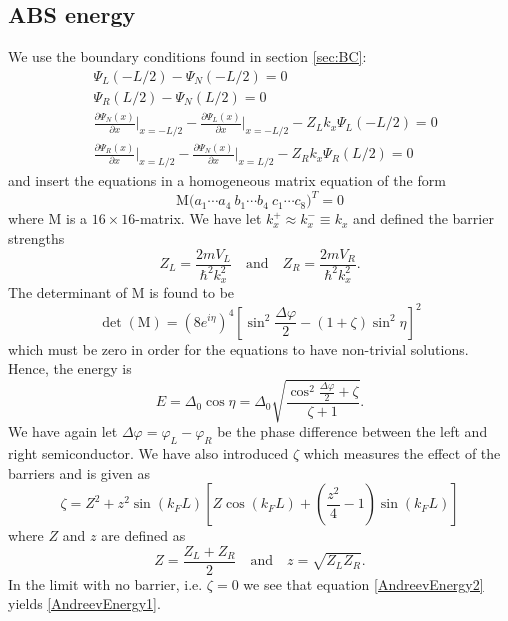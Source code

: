 \subsection{ABS energy}
We use the boundary conditions found in section \ref{sec:BC}:
\begin{equation}
\begin{split}
    &\Psi_L(-L/2) - \Psi_N(-L/2) = 0\\
    &\Psi_R(L/2) - \Psi_N(L/2) = 0\\
    &\frac{\partial \Psi_N(x)}{\partial x}\bigg|_{x = -L/2} - \frac{\partial \Psi_L(x)}{\partial x}\bigg|_{x = -L/2} - Z_L k_x\Psi_L(-L/2) = 0\\
    &\frac{\partial \Psi_R(x)}{\partial x}\bigg|_{x = L/2} - \frac{\partial \Psi_N(x)}{\partial x}\bigg|_{x = L/2} - Z_R k_x\Psi_R(L/2) = 0
\end{split}
\end{equation}
and insert the equations in a homogeneous matrix equation of the form
\begin{equation}
\mathrm{M} \big(a_1 \cdots a_4 \ b_1 \cdots b_4 \ c_1 \cdots c_8\big)^T = 0
\end{equation} 
where $\mathrm{M}$ is a $16 \times 16$-matrix. We have let $k_x^+ \approx k_x^- \equiv k_x$ and defined the barrier strengths
\begin{equation}
    Z_L = \frac{2mV_L}{\hbar^2 k_x^2}
    \quad \mathrm{and} \quad
    Z_R = \frac{2mV_R}{\hbar^2 k_x^2}.
\end{equation}
The determinant of M is found to be
\begin{equation}
    \det(\mathrm{M}) = \left(8e^{i\eta}\right)^4\left[\sin^2\frac{\Delta\varphi}{2}-(1+\zeta)\sin^2\eta\right]^2
\end{equation}
which must be zero in order for the equations to have non-trivial solutions. Hence, the energy is
\begin{equation}
    E=\Delta_0\cos\eta = \Delta_0\sqrt{\frac{\cos^2 \frac{\Delta\varphi}{2} + \zeta}{\zeta + 1}}.
    \label{AndreevEnergy2}
\end{equation}
We have again let $\Delta\varphi = \varphi_L-\varphi_R$ be the phase difference between the left and right semiconductor. We have also introduced $\zeta$ which measures the effect of the barriers and is given as
\begin{equation}
    \zeta = Z^2 + z^2\sin(k_FL)\left[Z\cos(k_FL)+\left(\frac{z^2}{4}-1\right)\sin(k_FL)\right]
\end{equation}
where $Z$ and $z$ are defined as 
\begin{equation}
    Z=\frac{Z_L + Z_R}{2}
    \quad \mathrm{and} \quad
    z = \sqrt{Z_LZ_R}.
\end{equation}
In the limit with no barrier, i.e. $\zeta = 0$ we see that equation \eqref{AndreevEnergy2} yields \eqref{AndreevEnergy1}.


